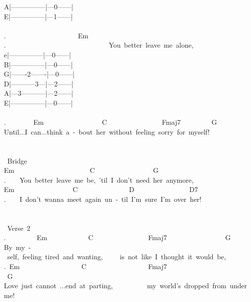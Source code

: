 {A|---------------|---0------|\\
E|---------------|---1------|\\
\\
.\ \ \ \ \ \ \ \ \ \ \ \ \ \ \ \ \ \ \ \ \ Em\\
.\ \ \ \ \ \ \ \ \ \ \ \ \ \ \ \ \ \ \ \ \ \ \ \ \ \ \ \ \ \ You\ better\ leave\ me\ alone,\\
e|---------------|---0------|\\
B|---------------|---0------|\\
G|-------2-------|---0------|\\
D|-----------3---|---2------|\\
A|---3-----------|---2------|\\
E|---------------|---0------|\\
\\
.\ \ \ \ \ \ \ \ Em\ \ \ \ \ \ \ \ \ \ \ \ \ \ \ \ \ C\ \ \ \ \ \ \ \ \ \ \ \ \ \ \ \ Fmaj7\ \ \ \ \ \ \ \ \ G\\
Until...I\ can...think\ a\ -\ bout\ her\ without\ feeling\ sorry\ for\ myself!\\
\\
\\
\lbrack\ Bridge\rbrack\\
Em\ \ \ \ \ \ \ \ \ \ \ \ \ \ \ \ \ \ \ \ \ \ C\ \ \ \ \ \ \ \ \ \ \ \ \ \ \ \ \ G\\
.\ \ \ \ You\ better\ leave\ me\ be,\ 'til\ I\ don't\ need\ her\ anymore,\\
Em\ \ \ \ \ \ \ \ \ \ \ \ \ \ \ \ \ C\ \ \ \ \ \ \ \ \ \ \ \ \ \ \ D\ \ \ \ \ \ \ \ \ \ \ \ \ \ \ \ D7\\
.\ \ \ \ I\ don't\ wanna\ meet\ again\ un\ -\ til\ I'm\ sure\ I'm\ over\ her!\\
\\
\\
\lbrack\ Verse\ 2\rbrack\\
.\ \ \ \ \ \ \ \ \ Em\ \ \ \ \ \ \ \ \ \ \ \ C\ \ \ \ \ \ \ \ \ \ \ \ \ \ \ \ Fmaj7\ \ \ \ \ \ \ \ \ \ \ \ \ \ \ \ \ G\\
By\ my\ -\ self,\ feeling\ tired\ and\ wanting,\ \ \ \ \ is\ not\ like\ I\ thought\ it\ would\ be,\\
.\ Em\ \ \ \ \ \ \ \ \ \ \ \ \ \ \ \ \ \ C\ \ \ \ \ \ \ \ \ \ \ \ \ \ \ \ \ \ Fmaj7\ \ \ \ \ \ \ \ \ \ \ \ \ \ \ \ \ \ \ \ \ \ \ \ \ G\\
Love\ just\ cannot\ ...end\ at\ parting,\ \ \ \ \ \ \ \ \ \ my\ world's\ dropped\ from\ under\ me!\\
\\
}
